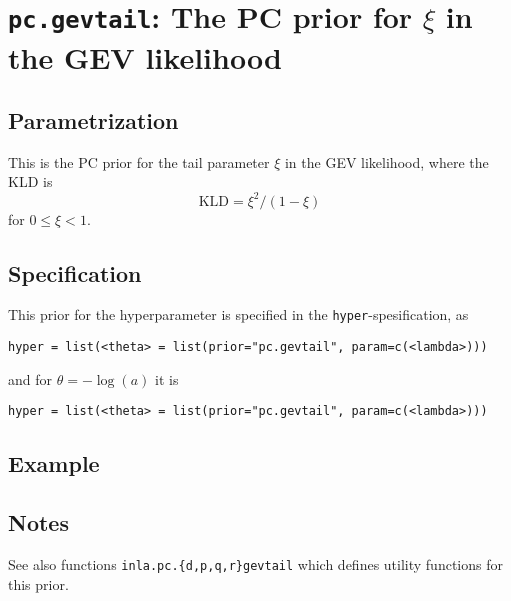 \documentclass[a4paper,11pt]{article}
\begin{document}
\section*{\texttt{pc.gevtail}: The PC prior for $\xi$ in the GEV likelihood}

\subsection*{Parametrization}

This is the PC prior for the tail parameter $\xi$ in the GEV
likelihood, where the KLD is
\begin{displaymath}
    \text{KLD} = \xi^{2}/(1-\xi)
\end{displaymath}
for $0 \le \xi < 1$.

\subsection*{Specification}
This prior for the hyperparameter is specified in the
\texttt{hyper}-spesification, as
\begin{center}
    \texttt{hyper = list(<theta> = list(prior="pc.gevtail", param=c(<lambda>)))}
\end{center}
and for $\theta = -\log(a)$ it is
\begin{center}
    \texttt{hyper = list(<theta> = list(prior="pc.gevtail", param=c(<lambda>)))}
\end{center}

\subsection*{Example}

\subsection*{Notes}

See also functions \texttt{inla.pc.\{d,p,q,r\}gevtail} which defines
utility functions for this prior.
\end{document}
